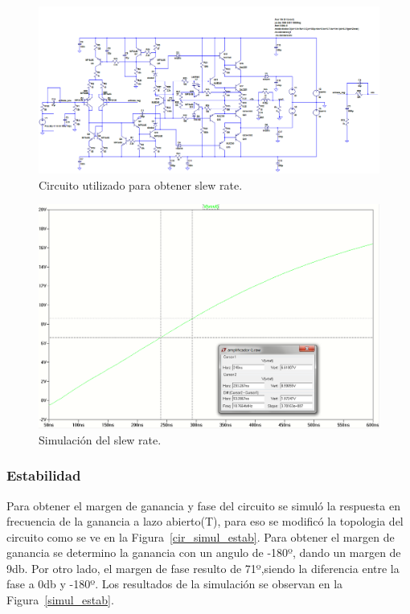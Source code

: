 \begin{figure}[H]
\centering
\includegraphics[width=1\textwidth]{img/slew_rate_cir.png}
\caption{Circuito utilizado para obtener slew rate.}
\label{cir_simul_slew_rate}
\end{figure}

\begin{figure}[H]
\centering
\centerline{\includegraphics[width=1\textwidth]{img/slew_rate.png}}
\caption{Simulación del slew rate.}
\label{simul_slew_rate}
\end{figure}

\medskip
\subsubsection{Estabilidad}

Para obtener el margen de ganancia y fase del circuito se simuló la respuesta en frecuencia de la ganancia a lazo abierto(T), para eso se modificó la topologia del circuito como se ve en la Figura~\ref{cir_simul_estab}. Para obtener el margen de ganancia se determino la ganancia con un angulo de -180º, dando un margen de 9db. Por otro lado, el margen de fase resulto de 71º,siendo la diferencia entre la fase a 0db y -180º.
Los resultados de la simulación se observan en la Figura~\ref{simul_estab}.

